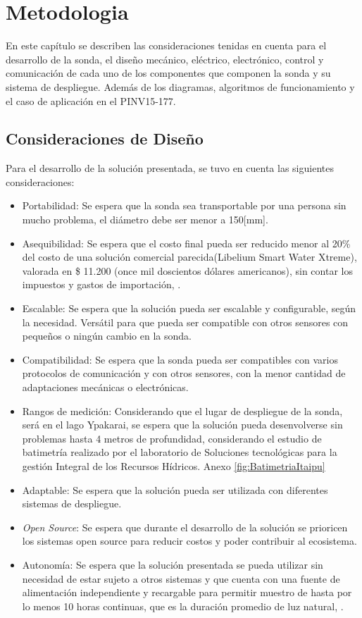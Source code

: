\chapter[Metodolog\'ia.]{Metodologia}
\pagestyle{fancy}

En este cap\'itulo se describen las consideraciones tenidas en cuenta para el desarrollo de la sonda, el diseño mec\'anico, el\'ectrico, electr\'onico, control y comunicaci\'on de cada uno de los componentes que componen la sonda y su sistema de despliegue. Adem\'as de los diagramas, algoritmos de funcionamiento y el caso de aplicaci\'on en el PINV15-177.

\section[Consideraciones del sistema]{Consideraciones de Dise\~no}
Para el desarrollo de la soluci\'on presentada, se tuvo en cuenta las siguientes consideraciones:
\begin{itemize}
    \item Portabilidad: Se espera que la sonda sea transportable por una persona sin mucho problema, el di\'ametro debe ser menor a 150[mm].
    \item Asequibilidad: Se espera que el costo final pueda ser reducido menor al 20\% del costo de una soluci\'on comercial parecida(Libelium Smart Water Xtreme), valorada en \$ 11.200 (once mil doscientos d\'olares americanos), sin contar los impuestos y gastos de importaci\'on, \cite{storeLibelium}.  
    \item Escalable: Se espera que la soluci\'on pueda ser escalable y configurable, seg\'un la necesidad. Vers\'atil para que pueda ser compatible con otros sensores con peque\~nos o ningún cambio en la sonda.
    \item Compatibilidad: Se espera que la sonda pueda ser compatibles con varios protocolos de comunicaci\'on y con otros sensores, con la menor cantidad de adaptaciones mec\'anicas o electr\'onicas. 
    \item Rangos de medici\'on: Considerando que el lugar de despliegue de la sonda, ser\'a en el lago Ypakarai, se espera que la soluci\'on pueda desenvolverse sin problemas hasta 4 metros de profundidad, considerando el estudio de batimetr\'ia realizado por el laboratorio de Soluciones tecnol\'ogicas para la gesti\'on Integral de los Recursos H\'idricos. Anexo \ref{fig:BatimetriaItaipu}
    \item Adaptable: Se espera que la soluci\'on pueda ser utilizada con diferentes sistemas de despliegue.
    \item \textit{Open Source}: Se espera que durante el desarrollo de la soluci\'on se prioricen los sistemas open source para reducir costos y poder contribuir al ecosistema. 
    \item Autonom\'ia: Se espera que la soluci\'on presentada se pueda utilizar sin necesidad de estar sujeto a otros sistemas y que cuenta con una fuente de alimentaci\'on independiente y recargable para permitir muestro de hasta por lo menos 10 horas continuas, que es la duraci\'on promedio de luz natural, \cite{ClimaSol}. 
\end{itemize}
